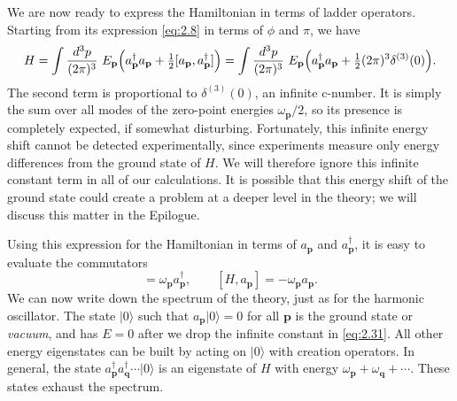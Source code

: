 We are now ready to express the Hamiltonian in terms of ladder operators.
Starting from its expression \eqref{eq:2.8} in terms of $\phi$ and $\pi$,
we have
\begin{equation}
  H = \int \frac{d^3p}{(2\pi)^3}\ E_{\mathbf{p}}
    \Bigl( a_{\mathbf{p}}^\dagger a_{\mathbf{p}}
      + \tfrac{1}{2}[a_{\mathbf{p}}, a_{\mathbf{p}}^\dagger] \Bigr)
  = \int \frac{d^3p}{(2\pi)^3}\ E_{\mathbf{p}}
    \Bigl( a_{\mathbf{p}}^\dagger a_{\mathbf{p}}
      + \tfrac{1}{2}(2\pi)^3\delta^{(3)}(0) \Bigr).
  \label{eq:2.31}
\end{equation}
The second term is proportional to $\delta^{(3)}(0)$, an infinite c-number.
It is simply the sum over all modes of the zero-point energies
$\omega_{\mathbf{p}}/2$, so its presence is completely expected, if
somewhat disturbing.  Fortunately, this infinite energy shift cannot be
detected experimentally, since experiments measure only energy differences
from the ground state of $H$.  We will therefore ignore this infinite
constant term in all of our calculations.  It is possible that this energy
shift of the ground state could create a problem at a deeper level in the
theory; we will discuss this matter in the Epilogue.

Using this expression for the Hamiltonian in terms of $a_{\mathbf{p}}$ and
$a_{\mathbf{p}}^\dagger$, it is easy to evaluate the commutators
\begin{equation}
  [H, a_{\mathbf{p}}^\dagger] = \omega_{\mathbf{p}}a_{\mathbf{p}}^\dagger,
  \qquad [H, a_{\mathbf{p}}] = -\omega_{\mathbf{p}}a_{\mathbf{p}} .
  \label{eq:2.32}
\end{equation}
We can now write down the spectrum of the theory, just as for the harmonic
oscillator.  The state $|0\rangle$ such that $a_{\mathbf{p}}|0\rangle = 0$
for all $\mathbf{p}$ is the ground state or \emph{vacuum}, and has $E=0$
after we drop the infinite constant in \eqref{eq:2.31}.  All other energy
eigenstates can be built by acting on $|0\rangle$ with creation operators.
In general, the state
$a_{\mathbf{p}}^\dagger a_{\mathbf{q}}^\dagger\cdots|0\rangle$ is an
eigenstate of $H$ with energy $\omega_{\mathbf{p}} + \omega_{\mathbf{q}}
+ \cdots$.  These states exhaust the spectrum.

